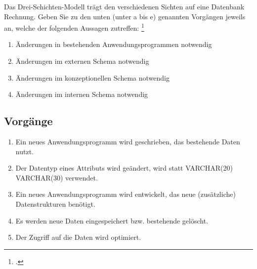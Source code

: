 \documentclass{bschlangaul-aufgabe}
\begin{document}


Das Drei-Schichten-Modell trägt den verschiedenen Sichten auf eine
Datenbank Rechnung. Geben Sie zu den unten (unter a bis e) genannten
Vorgängen jeweils an, welche
der folgenden Aussagen zutreffen:
\footcite{db:ab:klausurvorbereitung}

\begin{enumerate}
\item Änderungen in bestehenden Anwendungsprogrammen notwendig
\item Änderungen im externen Schema notwendig
\item Änderungen im konzeptionellen Schema notwendig
\item Änderungen im internen Schema notwendig
\end{enumerate}

\subsection{Vorgänge}

\begin{enumerate}


\item Ein neues Anwendungsprogramm wird geschrieben, das bestehende
Daten nutzt.


\item Der Datentyp eines Attributs wird geändert, \zB wird statt
VARCHAR(20) VARCHAR(30) verwendet.


\item Ein neues Anwendungsprogramm wird entwickelt, das neue
(zusätzliche) Datenstrukturen benötigt.


\item Es werden neue Daten eingespeichert bzw. bestehende gelöscht.


\item Der Zugriff auf die Daten wird optimiert.
\end{enumerate}
\end{document}
